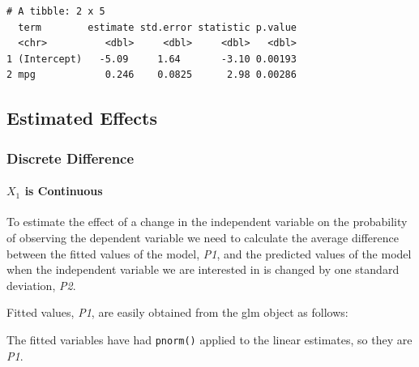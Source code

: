 \documentclass[]{book}
\newenvironment{Shaded}{\begin{snugshade}}{\end{snugshade}}
\newcommand{\DataTypeTok}[1]{\textcolor[rgb]{0.13,0.29,0.53}{#1}}
\newcommand{\KeywordTok}[1]{\textcolor[rgb]{0.13,0.29,0.53}{\textbf{#1}}}
\newcommand{\NormalTok}[1]{#1}
\newcommand{\OperatorTok}[1]{\textcolor[rgb]{0.81,0.36,0.00}{\textbf{#1}}}
\newcommand{\StringTok}[1]{\textcolor[rgb]{0.31,0.60,0.02}{#1}}
\let\oldparagraph\paragraph
\renewcommand{\paragraph}[1]{\oldparagraph{#1}\mbox{}}
\begin{document}
\begin{verbatim}
# A tibble: 2 x 5
  term        estimate std.error statistic p.value
  <chr>          <dbl>     <dbl>     <dbl>   <dbl>
1 (Intercept)   -5.09     1.64       -3.10 0.00193
2 mpg            0.246    0.0825      2.98 0.00286
\end{verbatim}

\hypertarget{estimated-effects}{%
\subsection{Estimated Effects}\label{estimated-effects}}

\hypertarget{discrete-difference}{%
\subsubsection{Discrete Difference}\label{discrete-difference}}

\hypertarget{x_1-is-continuous}{%
\paragraph{\texorpdfstring{\(X_1\) is Continuous}{X\_1 is Continuous}}\label{x_1-is-continuous}}

To estimate the effect of a change in the independent variable on the probability of observing the dependent variable we need to calculate the average difference between the fitted values of the model, \emph{P1}, and the predicted values of the model when the independent variable we are interested in is changed by one standard deviation, \emph{P2}.

Fitted values, \emph{P1}, are easily obtained from the glm object as follows:

\begin{Shaded}
\end{Shaded}

The fitted variables have had \texttt{pnorm()} applied to the linear estimates, so they are \emph{P1}.
\end{document}
